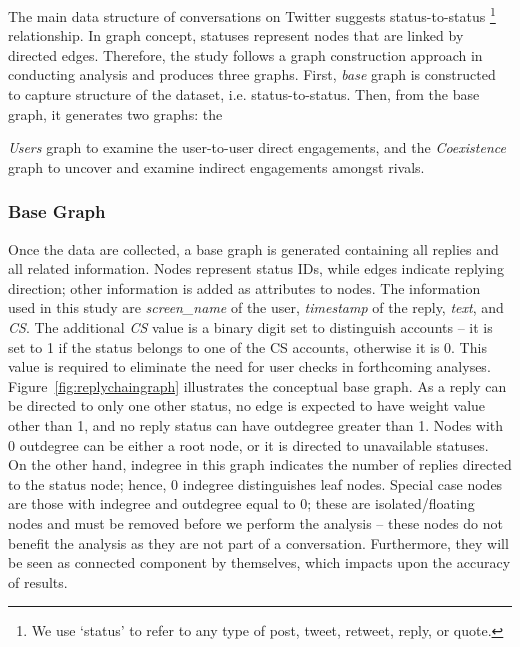 \documentclass[sigconf]{acmart}
\begin{document}
The main data structure of conversations on Twitter suggests
status-to-status {\footnote{We use `status' to refer to any type of post, tweet,
retweet, reply, or quote.}} relationship. In graph concept, statuses
represent nodes that are linked by directed edges. Therefore, the
study follows a graph construction approach in conducting analysis and
produces three graphs. First, {\emph{base}} graph is constructed to
capture structure of the dataset, i.e. status-to-status.  Then, from
the base graph, it generates two graphs: the {\emph{Users} graph to
examine the user-to-user direct engagements, and the {\emph{Coexistence}}
graph to uncover and examine indirect engagements amongst rivals.

\subsubsection{Base Graph}

Once the data are collected, a base graph is generated containing all
replies and all related information. Nodes represent status IDs, while
edges indicate replying direction; other information is added as
attributes to nodes. The information used in this study are
{\emph{screen\_name}} of the user, {\emph{timestamp}} of the reply,
{\emph{text}}, and {\emph{CS}}. The additional {\emph{CS}} value is a
binary digit set to distinguish accounts -- it is set to 1 if the status
belongs to one of the CS accounts, otherwise it is 0. This value is
required to eliminate the need for user checks in forthcoming
analyses. Figure~\ref{fig:replychaingraph} illustrates the conceptual base
graph. As a reply can be directed to only one other status, no edge is
expected to have weight value other than 1, and no reply status can
have outdegree greater than 1. Nodes with 0 outdegree can be either a
root node, or it is directed to unavailable statuses. On the other
hand, indegree in this graph indicates the number of replies directed to
the status node; hence, 0 indegree distinguishes leaf nodes. Special case
nodes are those with indegree and outdegree equal to 0; these are
isolated/floating nodes and must be removed before we perform the
analysis -- these nodes do not benefit the analysis as they are not
part of a conversation. Furthermore, they will be seen as connected
component by themselves, which impacts upon the accuracy of results.

}
\end{document}
